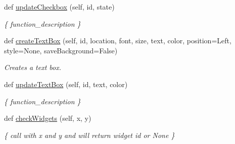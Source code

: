 \begin{DoxyCompactItemize}
def \hyperlink{classez_g_f_x_1_1earth_l_c_d_1_1earth_l_c_d_abb9f7fbcf73964522ed6d7da5ba3b8e2}{update\+Checkbox} (self, id, state)
\begin{DoxyCompactList}\small\item\em \{ function\+\_\+description \} \end{DoxyCompactList}\item 
def \hyperlink{classez_g_f_x_1_1earth_l_c_d_1_1earth_l_c_d_aba453c9d165b50ef8fda463b31d8af74}{create\+Text\+Box} (self, id, location, font, size, text, color, position=\textquotesingle{}Left\textquotesingle{}, style=None, save\+Background=False)
\begin{DoxyCompactList}\small\item\em Creates a text box. \end{DoxyCompactList}\item 
def \hyperlink{classez_g_f_x_1_1earth_l_c_d_1_1earth_l_c_d_a4dd0ce88479753b6b717b6c18ada01c9}{update\+Text\+Box} (self, id, text, color)
\begin{DoxyCompactList}\small\item\em \{ function\+\_\+description \} \end{DoxyCompactList}\item 
def \hyperlink{classez_g_f_x_1_1earth_l_c_d_1_1earth_l_c_d_ae100f4bc0bafaead25d23280110509f6}{check\+Widgets} (self, x, y)
\begin{DoxyCompactList}\small\item\em \{ call with x and y and will return widget id or None \} \end{DoxyCompactList}\end{DoxyCompactItemize}
